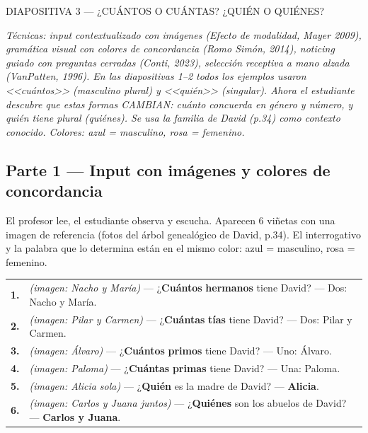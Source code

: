 \documentclass[a4paper,10pt]{article}
\renewcommand{\arraystretch}{1.3}
\newcommand{\diapheader}[2]{%
  \noindent\begin{tcolorbox}[
    colback=naranja,
    colframe=naranja,
    coltext=white,
    fontupper=\bfseries\large,
    boxrule=0pt,
    arc=3pt,
    left=6pt, right=6pt, top=4pt, bottom=4pt
  ]
  DIAPOSITIVA #1 — #2
  \end{tcolorbox}
}
\begin{document}
\diapheader{3}{¿CUÁNTOS O CUÁNTAS? ¿QUIÉN O QUIÉNES?}

\vspace{0.2cm}

\begin{marsbox}
\textit{Técnicas: input contextualizado con imágenes (Efecto de modalidad, Mayer 2009), gramática visual con colores de concordancia (Romo Simón, 2014), noticing guiado con preguntas cerradas (Conti, 2023), selección receptiva a mano alzada (VanPatten, 1996). En las diapositivas 1--2 todos los ejemplos usaron <<cuántos>> (masculino plural) y <<quién>> (singular). Ahora el estudiante descubre que estas formas CAMBIAN: cuánto concuerda en género y número, y quién tiene plural (quiénes). Se usa la familia de David (p.34) como contexto conocido. Colores: \textcolor{azulmasc}{azul} = masculino, \textcolor{rosafem}{rosa} = femenino.}
\end{marsbox}

\vspace{0.3cm}

\subsection*{\textcolor{naranja}{Parte 1 --- Input con imágenes y colores de concordancia}}

{\small El profesor lee, el estudiante observa y escucha. Aparecen 6 viñetas con una imagen de referencia (fotos del árbol genealógico de David, p.34). El interrogativo y la palabra que lo determina están en el mismo color: \textcolor{azulmasc}{azul} = masculino, \textcolor{rosafem}{rosa} = femenino.}

\vspace{0.2cm}

\renewcommand{\arraystretch}{1.6}
\begin{tabular}{@{}c p{13cm}@{}}
\textbf{1.} & \textit{(imagen: Nacho y María)} --- ¿\textcolor{azulmasc}{\textbf{Cuántos}} \textcolor{azulmasc}{\textbf{hermanos}} tiene David? --- Dos: Nacho y María. \\[4pt]
\textbf{2.} & \textit{(imagen: Pilar y Carmen)} --- ¿\textcolor{rosafem}{\textbf{Cuántas}} \textcolor{rosafem}{\textbf{tías}} tiene David? --- Dos: Pilar y Carmen. \\[4pt]
\textbf{3.} & \textit{(imagen: Álvaro)} --- ¿\textcolor{azulmasc}{\textbf{Cuántos}} \textcolor{azulmasc}{\textbf{primos}} tiene David? --- Uno: Álvaro. \\[4pt]
\textbf{4.} & \textit{(imagen: Paloma)} --- ¿\textcolor{rosafem}{\textbf{Cuántas}} \textcolor{rosafem}{\textbf{primas}} tiene David? --- Una: Paloma. \\[4pt]
\textbf{5.} & \textit{(imagen: Alicia sola)} --- ¿\textbf{Quién} es la madre de David? --- \textbf{Alicia}. \\[4pt]
\textbf{6.} & \textit{(imagen: Carlos y Juana juntos)} --- ¿\textbf{Quiénes} son los abuelos de David? --- \textbf{Carlos y Juana}. \\
\end{tabular}
\end{document}
